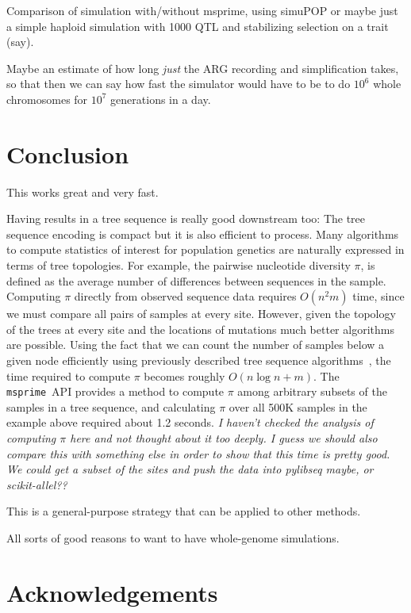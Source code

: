 \documentclass{article}
\newcommand{\msprime}{\texttt{msprime}}
\newcommand{\jk}[1]{{\em \color{red} #1}}
\begin{document}
Comparison of simulation with/without msprime, using simuPOP
or maybe just a simple haploid simulation with 1000 QTL and stabilizing selection on a trait (say).

Maybe an estimate of how long \emph{just} the ARG recording and simplification takes,
so that then we can say how fast the simulator would have to be to do $10^6$ whole chromosomes for $10^7$ generations
in a day.

\section*{Conclusion}

This works great and very fast.

Having results in a tree sequence is really good downstream too:
The tree sequence encoding is compact but it is also efficient to process.
Many algorithms to compute statistics of interest for population genetics
are naturally expressed in terms of tree topologies. For example, the
pairwise nucleotide diversity $\pi$, is defined as the average number of
differences between sequences in the sample. Computing $\pi$ directly
from observed sequence data requires $O(n^2 m)$ time, since we must
compare all pairs of samples at every site. However, given the topology of
the trees at every site and the locations of mutations much better algorithms
are possible. Using the fact that we can count the number of samples below
a given node efficiently using previously described tree sequence
algorithms~\citep{kelleher2016efficient}, the time required to compute $\pi$
becomes roughly $O(n \log n + m)$.
The \msprime\ API provides a method to compute $\pi$ among arbitrary subsets of the
samples in a tree sequence, and calculating $\pi$ over all 500K samples
in the example above required about 1.2 seconds.
\jk{I haven't checked the analysis of computing $\pi$ here and not thought about
it too deeply. I guess we should also compare this with something else in order to
show that this time is pretty good. We could get a subset of the sites and push
the data into pylibseq maybe, or scikit-allel??}

This is a general-purpose strategy that can be applied to other methods.

All sorts of good reasons to want to have whole-genome simulations.

\section*{Acknowledgements}
\end{document}
